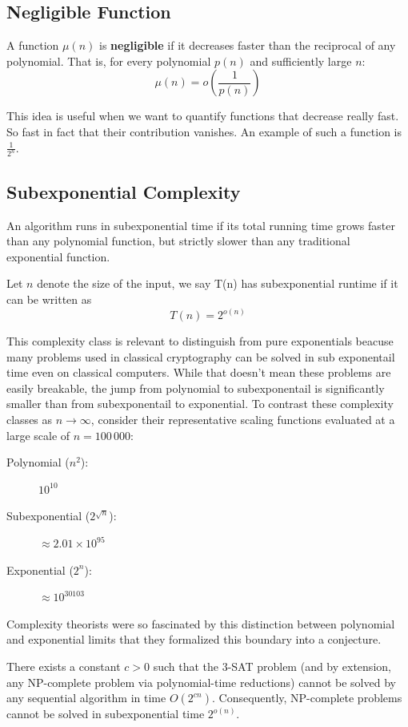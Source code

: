 \subsection{Negligible Function}

\begin{definition}
A function $\mu(n)$ is \textbf{negligible} if it decreases faster than the reciprocal of any polynomial. That is, for every polynomial $p(n)$ and sufficiently large $n$:
\[
\mu(n) = o\left(\frac{1}{p(n)}\right)
\]
\end{definition}

This idea is useful when we want to quantify functions that decrease really fast. So fast in fact that their contribution vanishes. An example of such a function is $\frac{1}{2^n}$.

\subsection{Subexponential Complexity}

An algorithm runs in subexponential time if its total running time grows faster than any polynomial function, but strictly slower than any traditional exponential function.

\begin{definition}
Let $n$ denote the size of the input, we say T(n) has subexponential runtime if it can be written as
\[
T(n) = 2^{o(n)}
\]
\end{definition}

This complexity class is relevant to distinguish from pure exponentials beacuse many problems used in classical cryptography can be solved in sub exponentail time even on classical computers. While that doesn't mean these problems are easily breakable, the jump from polynomial to subexponentail is significantly smaller than from subexponentail to exponential. To contrast these complexity classes as $n \to \infty$, consider their representative scaling functions evaluated at a large scale of $n = 100\,000$:

\begin{description}
    \item[Polynomial ($n^2$):] 
    $10^{10}$
    
    \item[Subexponential ($2^{\sqrt{n}}$):] 
    $\approx 2.01 \times 10^{95}$
    
    \item[Exponential ($2^n$):] 
    $\approx 10^{30103}$
\end{description}

Complexity theorists were so fascinated by this distinction between polynomial and exponential limits that they formalized this boundary into a conjecture.

\begin{theorem}
There exists a constant $c > 0$ such that the 3-SAT problem (and by extension, any NP-complete problem via polynomial-time reductions) cannot be solved by any sequential algorithm in time $O(2^{cn})$. Consequently, NP-complete problems cannot be solved in subexponential time $2^{o(n)}$\cite{Impagliazzo1999ComplexityOfKSAT}.
\end{theorem}